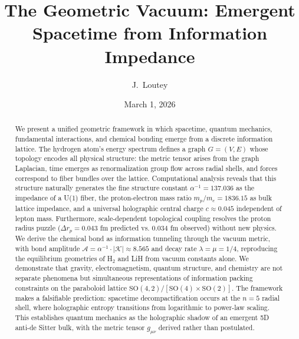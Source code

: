 \documentclass[aps,prd,twocolumn,superscriptaddress,groupedaddress,showpacs]{revtex4-2}
\newcommand{\alphainv}{\ensuremath{\alpha^{-1}}}
\newcommand{\SO}{\ensuremath{\text{SO}}}
\begin{document}
\title{The Geometric Vacuum: Emergent Spacetime from Information Impedance}

\author{J.~Loutey}

\date{March 1, 2026}

\begin{abstract}
We present a unified geometric framework in which spacetime, quantum mechanics, fundamental interactions, and chemical bonding emerge from a discrete information lattice. The hydrogen atom's energy spectrum defines a graph $G = (V, E)$ whose topology encodes all physical structure: the metric tensor arises from the graph Laplacian, time emerges as renormalization group flow across radial shells, and forces correspond to fiber bundles over the lattice. Computational analysis reveals that this structure naturally generates the fine structure constant $\alphainv = 137.036$ as the impedance of a U(1) fiber, the proton-electron mass ratio $m_p/m_e = 1836.15$ as bulk lattice impedance, and a universal holographic central charge $c \approx 0.045$ independent of lepton mass. Furthermore, scale-dependent topological coupling resolves the proton radius puzzle ($\Delta r_p = 0.043$ fm predicted vs. $0.034$ fm observed) without new physics. We derive the chemical bond as information tunneling through the vacuum metric, with bond amplitude $\mathcal{A} = \alphainv \cdot |\mathcal{K}| \approx 8.565$ and decay rate $\lambda = \mu = 1/4$, reproducing the equilibrium geometries of H$_2$ and LiH from vacuum constants alone. We demonstrate that gravity, electromagnetism, quantum structure, and chemistry are not separate phenomena but simultaneous representations of information packing constraints on the paraboloid lattice $\SO(4,2)/[\SO(4) \times \SO(2)]$. The framework makes a falsifiable prediction: spacetime decompactification occurs at the $n=5$ radial shell, where holographic entropy transitions from logarithmic to power-law scaling. This establishes quantum mechanics as the holographic shadow of an emergent 5D anti-de Sitter bulk, with the metric tensor $g_{\mu\nu}$ derived rather than postulated.
\end{abstract}


\maketitle
\end{document}
